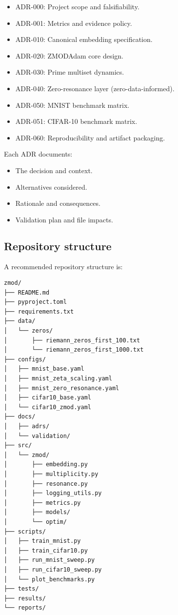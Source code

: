 \documentclass[11pt]{article}
\begin{document}
\begin{itemize}[leftmargin=*]
  \item ADR-000: Project scope and falsifiability.
  \item ADR-001: Metrics and evidence policy.
  \item ADR-010: Canonical embedding specification.
  \item ADR-020: ZMODAdam core design.
  \item ADR-030: Prime multiset dynamics.
  \item ADR-040: Zero-resonance layer (zero-data-informed).
  \item ADR-050: MNIST benchmark matrix.
  \item ADR-051: CIFAR-10 benchmark matrix.
  \item ADR-060: Reproducibility and artifact packaging.
\end{itemize}

Each ADR documents:
\begin{itemize}[leftmargin=*]
  \item The decision and context.
  \item Alternatives considered.
  \item Rationale and consequences.
  \item Validation plan and file impacts.
\end{itemize}

\subsection{Repository structure}

A recommended repository structure is:

\begin{verbatim}
zmod/
├── README.md
├── pyproject.toml
├── requirements.txt
├── data/
│   └── zeros/
│       ├── riemann_zeros_first_100.txt
│       └── riemann_zeros_first_1000.txt
├── configs/
│   ├── mnist_base.yaml
│   ├── mnist_zeta_scaling.yaml
│   ├── mnist_zero_resonance.yaml
│   ├── cifar10_base.yaml
│   └── cifar10_zmod.yaml
├── docs/
│   ├── adrs/
│   └── validation/
├── src/
│   └── zmod/
│       ├── embedding.py
│       ├── multiplicity.py
│       ├── resonance.py
│       ├── logging_utils.py
│       ├── metrics.py
│       ├── models/
│       └── optim/
├── scripts/
│   ├── train_mnist.py
│   ├── train_cifar10.py
│   ├── run_mnist_sweep.py
│   ├── run_cifar10_sweep.py
│   └── plot_benchmarks.py
├── tests/
├── results/
└── reports/
\end{verbatim}
\end{document}
